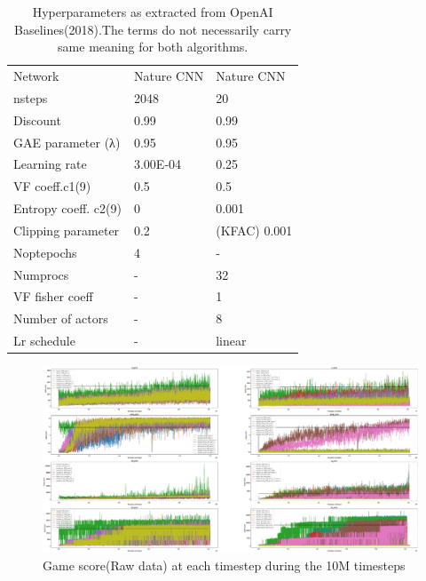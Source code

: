 \begin{table}[]
	\begin{tabular}{l|ll}
		\thead{Hyperparameters} & \thead{PPO2} & \thead{ACKTR} \\
		\hline
		Network & Nature CNN & Nature CNN \\
		nsteps & 2048 & 20 \\
		Discount & 0.99 & 0.99 \\
		GAE parameter (λ) & 0.95 & 0.95 \\
		Learning rate & 3.00E-04 & 0.25 \\
		VF coeff.c1(9) & 0.5 & 0.5 \\
		Entropy coeff. c2(9) & 0 & 0.001 \\
		Clipping parameter & 0.2 & (KFAC) 0.001 \\
		Noptepochs & 4 & - \\
		Numprocs & - & 32 \\
		VF fisher coeff & - & 1 \\
		Number of actors & - & 8 \\
		Lr schedule & - & linear \\
		\hline
	\end{tabular}
\caption{Hyperparameters as extracted from OpenAI Baselines(2018).The terms do not necessarily carry same meaning for both algorithms.}
\end{table}

\begin{figure}[b]
	\includegraphics[width=\textwidth]{fig13.png} 
	\caption{Game score(Raw data) at each timestep during the 10M timesteps }
\end{figure}

